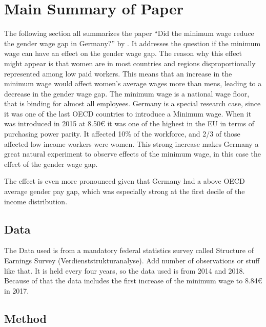 \documentclass[12pt,draft,a4paper]{article}
\begin{document}
\section{Main Summary of Paper}


The following section all summarizes the paper “Did the minimum wage reduce the gender wage gap in Germany?” by \citet{CALIENDO22}. It addresses the question if the minimum wage can have an effect on the gender wage gap. 
The reason why this effect might appear is that women are in most countries and regions disproportionally represented among low paid workers. \citep{kahn2015wage}
This means that an increase in the minimum wage would affect women's average wages more than mens, leading to a decrease in the gender wage gap.
The minimum wage is a national wage floor, that is binding for almost all employees. Germany is a special research case, since it was one of the last OECD countries to introduce a Minimum wage. 
When it was introduced in 2015 at 8.50€ it was one of the highest in the EU in terms of purchasing power parity. It affected 10\% of the workforce, and 2/3 of those affected low income workers were women.  
This strong increase makes Germany a great natural experiment to observe effects of the minimum wage, in this case the effect of the gender wage gap. 

The effect is even more pronounced given that Germany had a above OECD average gender pay gap, which was especially strong at the first decile of the income distribution. 
\subsection{Data}
The Data used is from a mandatory federal statistics survey called Structure of Earnings Survey (Verdienststrukturanalyse). 
Add number of observations or stuff like that.
It is held every four years, so the data used is from 2014 and 2018. Because of that the data includes the first increase of the minimum wage to 8.84€ in 2017.


\subsection{Method}
\end{document}
